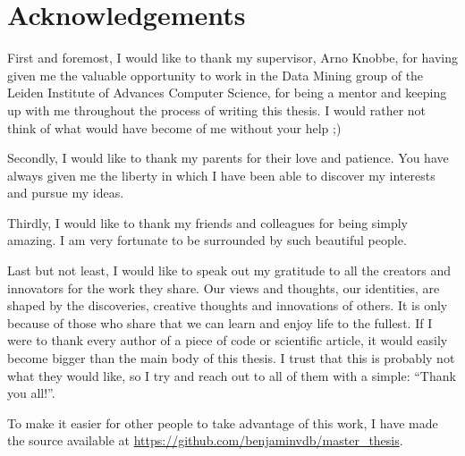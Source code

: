 \chapter*{Acknowledgements}
\noindent First and foremost, I would like to thank my supervisor, Arno Knobbe, for having given me the valuable opportunity to work in the Data Mining group of the Leiden Institute of Advances Computer Science, for being a mentor and keeping up with me throughout the process of writing this thesis.
I would rather not think of what would have become of me without your help ;)

Secondly, I would like to thank my parents for their love and patience.
You have always given me the liberty in which I have been able to discover my interests and pursue my ideas.

Thirdly, I would like to thank my friends and colleagues for being simply amazing.
I am very fortunate to be surrounded by such beautiful people.

Last but not least, I would like to speak out my gratitude to all the creators and innovators for the work they share.
Our views and thoughts, our identities, are shaped by the discoveries, creative thoughts and innovations of others.
It is only because of those who share that we can learn and enjoy life to the fullest.
If I were to thank every author of a piece of code or scientific article, it would easily become bigger than the main body of this thesis.
I trust that this is probably not what they would like, so I try and reach out to all of them with a simple: ``Thank you all!''.

\bigskip

\noindent To make it easier for other people to take advantage of this work, I have made the \latex source available at \url{https://github.com/benjaminvdb/master_thesis}.
